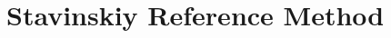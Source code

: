 \documentclass[ALICE,manyauthors]{cernphprep}
\newcommand{\LamK}{$\Lambda$K\xspace}
\begin{document}
\begin{comment}
  $\Sigma^{0}$K$^{*0}$ & 0.041 & $\bar{\Sigma}^{0}\bar{\mathrm{K}}^{*0}$ & 0.041 & $\Sigma^{0}\bar{\mathrm{K}}^{*0}$ & 0.041 & $\bar{\Sigma}^{0}$K$^{*0}$ & 0.041 & $\Sigma^{0}$K$^{*0}$ & 0.019 & $\bar{\Sigma}^{0}$K$^{*0}$ & 0.019 \\
  
  $\Xi^{0}$K$^{*0}$ & 0.014 & $\bar{\Xi}^{0}\bar{\mathrm{K}}^{*0}$ & 0.013 & $\Xi^{0}\bar{\mathrm{K}}^{*0}$ & 0.014 & $\bar{\Xi}^{0}$K$^{*0}$ & 0.013 & $\Xi^{0}$K$^{*0}$ & 0.007 & $\bar{\Xi}^{0}$K$^{*0}$ & 0.006 \\
  
  $\Xi^{-}$K$^{*0}$ & 0.018 & $\bar{\Xi}^{+}\bar{\mathrm{K}}^{*0}$ & 0.017 & $\Xi^{-}\bar{\mathrm{K}}^{*0}$ & 0.018 & $\bar{\Xi}^{+}$K$^{*0}$ & 0.017 & $\Xi^{-}$K$^{*0}$ & 0.009 & $\bar{\Xi}^{+}$K$^{*0}$ & 0.008 \\
  
  Other & 0.295 & Other & 0.310 & Other & 0.299 & Other & 0.307 & Other & 0.318 & Other & 0.330 \\
  
  Fakes & 0.048 & Fakes & 0.048 & Fakes & 0.048 & Fakes & 0.048 & Fakes & 0.048 & Fakes & 0.048 \\
  
  \hlineB{3.0}
 \end{tabular}}
 \caption{$\lambda$ values for the individual components of the \LamK correlation functions for the case of 3 and 10 residual contributions.}
 \label{tab:LambdaValues_All}
\end{table}

\end{landscape}
\end{comment}


\section{Stavinskiy Reference Method}
\label{App:StavMethod}
\end{document}

